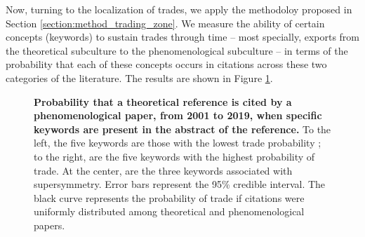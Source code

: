 \documentclass[smallextended]{svjour3}
\begin{document}
\begin{figure*}
    \centering
    
    \caption{\textbf{Origin of the references (citations) in the \gls{hep} literature}
    Each matrix element $\tilde{n}_{ij}$ represents the fraction of references from the x-axis category (columns) that target papers from the y-axis category (lines). For instance, 49\% of references in experimental papers refer to experimental papers. 22\% of citations from phenomenological papers refer to experimental papers. If these categories were completely hermetic, the matrix would equal the identity matrix, which is not the case.}
    \label{fig:cites_matrix}
\end{figure*}

Now, turning to the localization of trades, we apply the methodoloy proposed in Section \ref{section:method_trading_zone}. We measure the ability of certain concepts (keywords) to sustain trades through time -- most specially, exports from the theoretical subculture to the phenomenological subculture -- in terms of the probability that each of these concepts occurs in citations across these two categories of the literature. The results are shown in Figure \ref{fig:cross_citations_probs}.

\begin{figure}
    \centering
    
    \caption{\textbf{Probability that a theoretical reference is cited by a phenomenological paper, from 2001 to 2019, when specific keywords are present in the abstract of the reference.} To the left, the five keywords are those with the lowest trade probability ; to the right, are the five keywords with the highest probability of trade. At the center, are the three keywords associated with supersymmetry. Error bars represent the 95\% credible interval. The black curve represents the probability of trade if citations were uniformly distributed among theoretical and phenomenological papers.} 
    \label{fig:cross_citations_probs}
\end{figure}
\end{document}

